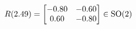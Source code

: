 \documentclass[preview]{standalone}
\begin{document}
\begin{align*}
\special{dvisvgm:raw <g id='unique000'>}R(2.49) = \begin{bmatrix} -0.80 & -0.60 \\ 0.60 & -0.80 \end{bmatrix} \in \text{SO}(2)\special{dvisvgm:raw </g>}
\end{align*}
\end{document}
